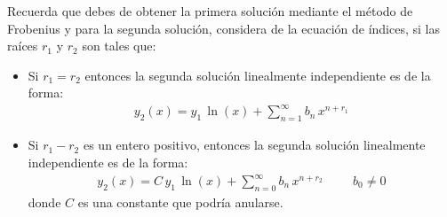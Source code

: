\begin{enumerate}
Recuerda que debes de obtener la primera solución mediante el método de Frobenius y para la segunda solución, considera de la ecuación de índices, si las raíces $r_{1}$ y $r_{2}$ son tales que:
\begin{itemize}
\item Si $r_{1} = r_{2}$ entonces la segunda solución linealmente independiente es de la forma:
\begin{align*}
y_{2} (x) = y_{1} \, \ln(x) + \sum_{n=1}^{\infty} b_{n} \, x^{n+r_{1}}
\end{align*} 
\item Si $r_{1} - r_{2}$ es un entero positivo, entonces la segunda solución linealmente independiente es de la forma:
\begin{align*}
y_{2} (x) = C \, y_{1} \, \ln(x) + \sum_{n=0}^{\infty} b_{n} \, x^{n+r_{2}} \hspace{1cm} b_{0} \neq 0
\end{align*}
donde $C$ es una constante que podría anularse.
\end{itemize}
\end{enumerate}

